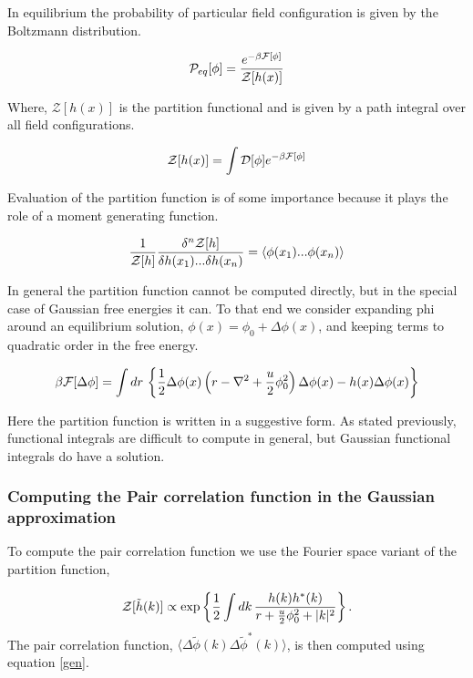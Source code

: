 In equilibrium the probability of particular field configuration is given by the Boltzmann distribution.

\begin{equation}
\mathcal{P}_{eq}[\phi] = \frac{e^{-\beta\mathcal{F}[\phi]}}{\mathcal{Z}[h(x)]}
\end{equation}

Where, $\mathcal{Z}[h(x)]$ is the partition functional and is given by a path integral over all field configurations.

\begin{equation}
\mathcal{Z}[h(x)] = \int \mathcal{D}[\phi] e^{-\beta\mathcal{F}[\phi]}
\end{equation}

Evaluation of the partition function is of some importance because it plays the role of a moment generating function.

\begin{equation}\label{gen}
\frac{1}{\mathcal{Z}[h]}\frac{\delta^n \mathcal{Z}[h]}{\delta h(x_1)...\delta h(x_n)} = \langle \phi(x_1)...\phi(x_n)\rangle
\end{equation}

In general the partition function cannot be computed directly, but in the special case of Gaussian free energies it can. To that end we consider expanding phi around an equilibrium solution, $\phi(x) = \phi_0 + \Delta\phi(x)$, and keeping terms to quadratic order in the free energy.

\begin{equation}
\beta\mathcal{F}[\Delta\phi] = \int dr \,\left\lbrace \frac{1}{2}\Delta\phi(x) \left(r - \nabla^2 + \frac{u}{2}\phi_0^2\right) \Delta\phi(x) - h(x)\Delta\phi(x) \right\rbrace
\end{equation}

Here the partition function is written in a suggestive form. As stated previously, functional integrals are difficult to compute in general, but Gaussian functional integrals do have a solution.

\subsubsection{Computing the Pair correlation function in the Gaussian approximation}

To compute the pair correlation function we use the Fourier space variant of the partition function,

\begin{equation}
\mathcal{Z}[\tilde{h}(k)] \propto \exp\left\lbrace \frac{1}{2}\int dk\,\frac{h(k)h^{*}(k)}{r + \frac{u}{2}\phi_0^2 +  \vert k \vert^2}\right\rbrace.
\end{equation}
The pair correlation function, $\langle \Delta\tilde{\phi}(k)\Delta\tilde{\phi}^{*}(k)\rangle$, is then computed using equation \ref{gen}.

